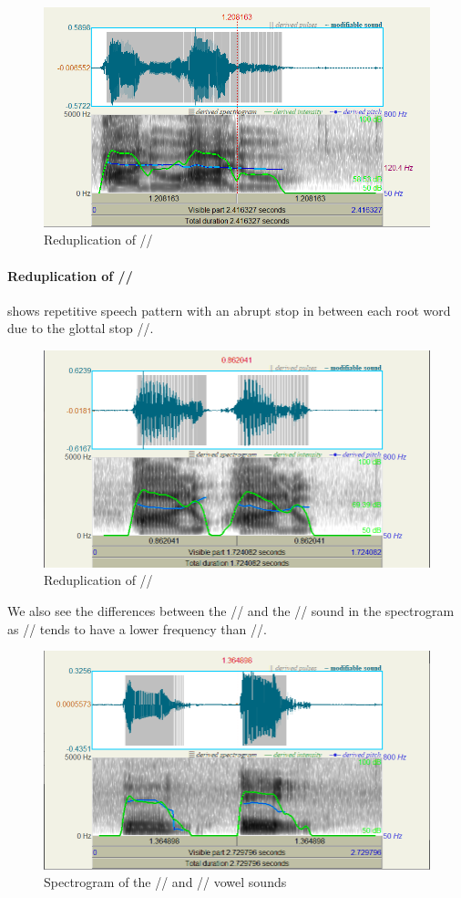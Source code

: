 \documentclass{article}
\begin{document}
\begin{figure}
	\centering
	\includegraphics[width=0.65\linewidth]{img/halu.png}
	\caption{Reduplication of //}\label{fig:halu}
\end{figure}

\paragraph{Reduplication of //}  shows repetitive speech pattern with
an abrupt stop in between each root word due to the glottal stop //.

\begin{figure}
	\centering
	\includegraphics[width=0.65\linewidth]{img/hal_u.png}
	\caption{Reduplication of //}\label{fig:hal'u}
\end{figure}

We also see the differences between the // and the //
sound in the spectrogram as // tends to have a lower frequency than
//.

\begin{figure}
	\centering
	\includegraphics[width=0.65\linewidth]{img/u-o.png}
	\caption{Spectrogram of the // and // vowel sounds}\label{fig:u-o}
\end{figure}
\end{document}
